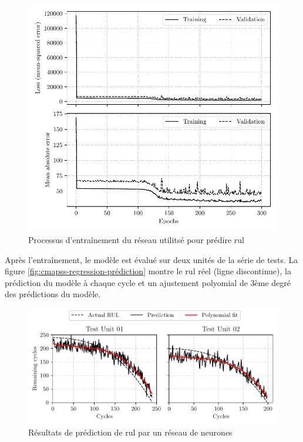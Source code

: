 \begin{figure}[H]
    \centering
    \includegraphics{figures/cmapss_regression_training.pdf}
    \caption{Processus d'entraînement du réseau utilitsé pour prédire \acrshort{rul}}
    \label{fig:cmapss-regression-training}
\end{figure}

Après l'entraînement, le modèle est évalué sur deux unités de la série de tests. La figure \ref{fig:cmapss-regression-prédiction} montre le \acrshort{rul} réel (ligne discontinue), la prédiction du modèle à chaque cycle et un ajustement polyomial de 3ème degré des prédictions du modèle.

\begin{figure}[H]
    \centering
    \includegraphics{figures/cmapss_regression_predictions.pdf}
    \caption{Résultats de prédiction de \acrshort{rul} par un réseau de neurones}
    \label{fig:cmapss-regression-prediction}
\end{figure}

